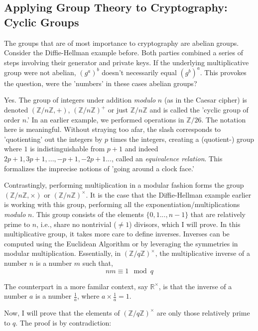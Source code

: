\documentclass[11pt, a4paper]{report}
\newcommand{\integers}{\mathbb{Z}}
\newcommand{\reals}{\mathbb{R}}
\begin{document}
\subsection{Applying Group Theory to Cryptography: Cyclic Groups}

  The groups that are of most importance to cryptography are abelian groups. Consider the Diffie-Hellman example before. Both parties combined a series of steps involving their generator and private keys. If the underlying multiplicative group were not abelian, $(g^a)^b$ doesn't necessarily equal $(g^b)^a$. This provokes the question, were the 'numbers' in these cases abelian groups?
 
 Yes. The group of integers under addition \textit{modulo} $n$ (as in the Caesar cipher) is denoted $(\integers / n \integers, +)$, $(\integers / n \integers)^{+}$ or just $\integers / n \integers$  and is called the 'cyclic group of order $n$.' In an earlier example, we performed operations in $\integers / 26$. The notation here is meaningful. Without straying too afar, the slash corresponds to 'quotienting' out the integers by $p$ times the integers, creating a (quotient-) group where $1$ is indistinguishable from $p+1$ and indeed $2p+1, 3p+1, ..., -p+1, -2p+1...$, called an \textit{equivalence relation}.\autocite[104]{saracino} This formalizes the imprecise notions of 'going around a clock face.'
  
  Contrastingly, performing multiplication in a modular fashion forms the group $(\integers / n \integers, \times)$ or $(\integers / n \integers)^{\times}$. It is the case that the Diffie-Hellman example earlier is working with this group, performing all the exponentiation/multiplications \textit{modulo} $n$. This group consists of the elements $\lbrace 0, 1 ...,n-1\rbrace$ that are relatively prime to $n$, i.e., share no nontrivial ($\neq 1$) divisors, which I will prove. In this multiplicative group, it takes more care to define inverses. Inverses can be computed using the Euclidean Algorithm or by leveraging the symmetries in modular multiplication.\autocite[36]{saracino} Essentially, in $(\integers / q \integers)^{\times}$, the multiplicative inverse of a number $n$ is a number $m$ such that,
\[ nm \equiv 1 \mod q\]

The counterpart in a more familar context, say $\reals^{\times}$, is that the inverse of a number $a$ is a number $\frac{1}{a}$, where $a \times \frac{1}{a} = 1$.

Now, I will prove that the elements of $(\integers / q \integers)^{\times}$ are only those relatively prime to $q$. The proof is by contradiction:
\end{document}
